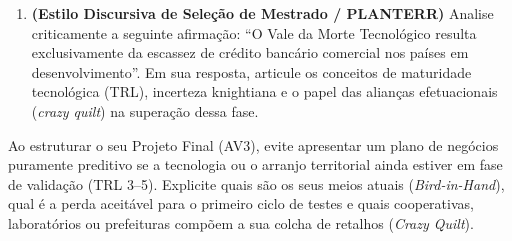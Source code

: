 \begin{enumerate}[leftmargin=1.5em, itemsep=6pt]
  \item \textbf{(Estilo Discursiva de Seleção de Mestrado / PLANTERR)} Analise criticamente a seguinte afirmação: ``O Vale da Morte Tecnológico resulta exclusivamente da escassez de crédito bancário comercial nos países em desenvolvimento''. Em sua resposta, articule os conceitos de maturidade tecnológica (TRL), incerteza knightiana e o papel das alianças efetuacionais (\textit{crazy quilt}) na superação dessa fase.
  \espacoResolucao[2.5cm]
\end{enumerate}

\begin{boxDica}
  Ao estruturar o seu Projeto Final (AV3), evite apresentar um plano de negócios puramente preditivo se a tecnologia ou o arranjo territorial ainda estiver em fase de validação (TRL 3–5). Explicite quais são os seus meios atuais (\textit{Bird-in-Hand}), qual é a perda aceitável para o primeiro ciclo de testes e quais cooperativas, laboratórios ou prefeituras compõem a sua colcha de retalhos (\textit{Crazy Quilt}).
\end{boxDica}

\clearpage
{}

